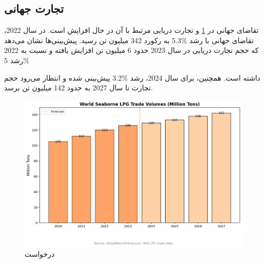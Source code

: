 \subsection{تجارت جهانی}
 تقاضای جهانی  
 در
  \cref{future}
 و تجارت دریایی مرتبط با آن در حال افزایش است. در سال 2022،
  تقاضای جهانی
    با رشد 
    $\%$5.3
    به رکورد 342 میلیون تن رسید. پیش‌بینی‌ها نشان می‌دهد که حجم تجارت دریایی
     در سال 2023 حدود 6 میلیون تن افزایش یافته و نسبت به 2022 رشد 5$\%$
   
      داشته است. همچنین، برای سال 2024، رشد
      $\%$3.2
        پیش‌بینی شده و انتظار می‌رود حجم تجارت تا سال 2027 به حدود 142 میلیون تن برسد.
 \begin{figure}[!h]
	\centering
	\includegraphics[width=15cm]{Figures/LPG/future.png}
	\caption{ درخواست }\label{future}
\end{figure} 
 
